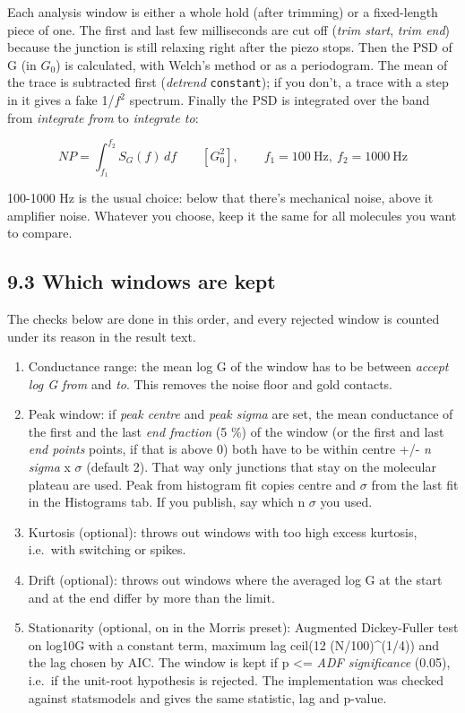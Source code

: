 \documentclass[
  11pt,
  a4paper,
]{article}
\providecommand{\tightlist}{%
  \setlength{\itemsep}{0pt}\setlength{\parskip}{0pt}}
\begin{document}
Each analysis window is either a whole hold (after trimming) or a
fixed-length piece of one. The first and last few milliseconds are cut
off (\emph{trim start}, \emph{trim end}) because the junction is still
relaxing right after the piezo stops. Then the PSD of G (in $G_0$) is
calculated, with Welch's method or as a periodogram. The mean of the
trace is subtracted first (\emph{detrend} \texttt{constant}); if you
don't, a trace with a step in it gives a fake 1/$f^{2}$ spectrum.
Finally the PSD is integrated over the band from \emph{integrate from}
to \emph{integrate to}:

\[
NP = \int_{f_1}^{f_2} S_G(f)\, df \qquad [G_0^2], \qquad f_1 = 100\ \mathrm{Hz},\ f_2 = 1000\ \mathrm{Hz}
\]

100-1000 Hz is the usual choice: below that there's mechanical noise,
above it amplifier noise. Whatever you choose, keep it the same for all
molecules you want to compare.

\hypertarget{which-windows-are-kept}{%
\subsection{9.3 Which windows are kept}\label{which-windows-are-kept}}

The checks below are done in this order, and every rejected window is
counted under its reason in the result text.

\begin{enumerate}
\def\labelenumi{\arabic{enumi}.}
\tightlist
\item
  Conductance range: the mean log G of the window has to be between
  \emph{accept log G from} and \emph{to}. This removes the noise floor
  and gold contacts.
\item
  Peak window: if \emph{peak centre} and \emph{peak sigma} are set, the
  mean conductance of the first and the last \emph{end fraction} (5 \%)
  of the window (or the first and last \emph{end points} points, if that
  is above 0) both have to be within centre +/- \emph{n sigma} x
  $\sigma$ (default 2). That way only junctions that stay on the
  molecular plateau are used. Peak from histogram fit copies centre and
  $\sigma$ from the last fit in the Histograms tab. If you publish, say
  which n $\sigma$ you used.
\item
  Kurtosis (optional): throws out windows with too high excess kurtosis,
  i.e.~with switching or spikes.
\item
  Drift (optional): throws out windows where the averaged log G at the
  start and at the end differ by more than the limit.
\item
  Stationarity (optional, on in the Morris preset): Augmented
  Dickey-Fuller test on log10\textbar G\textbar{} with a constant term,
  maximum lag ceil(12 (N/100)\^{}(1/4)) and the lag chosen by AIC. The
  window is kept if p \textless= \emph{ADF significance} (0.05), i.e.~if
  the unit-root hypothesis is rejected. The implementation was checked
  against statsmodels and gives the same statistic, lag and p-value.
\end{enumerate}
\end{document}
